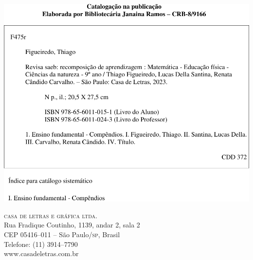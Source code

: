 \noindent\includegraphics[width=.5\textwidth]{../fichas/9MAT.png}

\vfill

\textsc{casa de letras e gráfica ltda.}\\
Rua Fradique Coutinho, 1139, andar 2, sala 2\\
CEP 05416--011 -- São Paulo/\textsc{sp}, Brasil\\
Telefone: (11) 3914--7790\\\smallskip
www.casadeletras.com.br\\

\endgroup
\pagebreak
